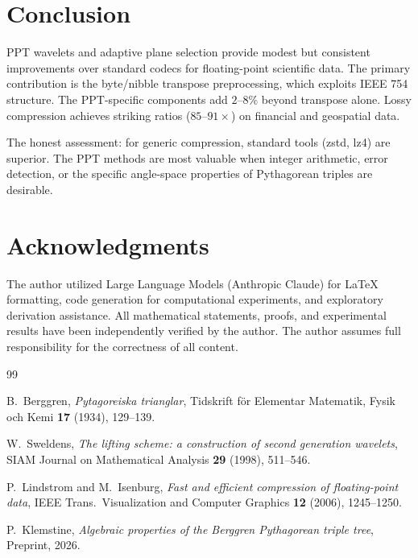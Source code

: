 \documentclass[12pt]{amsart}
\theoremstyle{definition}
\theoremstyle{remark}
\begin{document}
\section{Conclusion}\label{sec:conclusion}

PPT wavelets and adaptive plane selection provide modest but consistent
improvements over standard codecs for floating-point scientific data.
The primary contribution is the byte/nibble transpose preprocessing, which
exploits IEEE 754 structure. The PPT-specific components add $2$--$8\%$
beyond transpose alone. Lossy compression achieves striking ratios
($85$--$91\times$) on financial and geospatial data.

The honest assessment: for generic compression, standard tools (zstd, lz4)
are superior. The PPT methods are most valuable when integer arithmetic,
error detection, or the specific angle-space properties of Pythagorean
triples are desirable.

\section*{Acknowledgments}
The author utilized Large Language Models (Anthropic Claude) for \LaTeX{}
formatting, code generation for computational experiments, and exploratory
derivation assistance. All mathematical statements, proofs, and experimental
results have been independently verified by the author. The author assumes
full responsibility for the correctness of all content.

\begin{thebibliography}{99}

B.~Berggren,
\emph{Pytagoreiska trianglar},
Tidskrift f\"or Elementar Matematik, Fysik och Kemi \textbf{17} (1934), 129--139.

W.~Sweldens,
\emph{The lifting scheme: a construction of second generation wavelets},
SIAM Journal on Mathematical Analysis \textbf{29} (1998), 511--546.

P.~Lindstrom and M.~Isenburg,
\emph{Fast and efficient compression of floating-point data},
IEEE Trans.\ Visualization and Computer Graphics \textbf{12} (2006), 1245--1250.

P.~Klemstine,
\emph{Algebraic properties of the Berggren Pythagorean triple tree},
Preprint, 2026.

\end{thebibliography}
\end{document}
